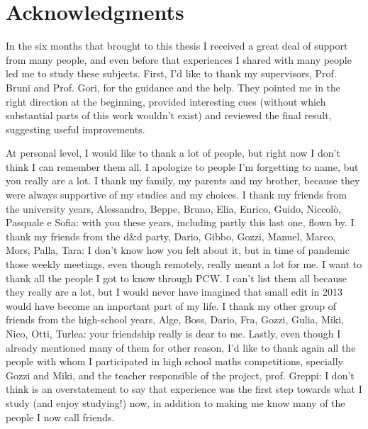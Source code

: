 \thispagestyle{plain}
\section*{Acknowledgments}
In the six months that brought to this thesis I received a great deal of support from many people, and even before that experiences I shared with many people led me to study these subjects.
First, I'd like to thank my supervisors, Prof. Bruni and Prof. Gori, for the guidance and the help. They pointed me in the right direction at the beginning, provided interesting cues (without which substantial parts of this work wouldn't exist) and reviewed the final result, suggesting useful improvements.

At personal level, I would like to thank a lot of people, but right now I don't think I can remember them all. I apologize to people I'm forgetting to name, but you really are a lot.
I thank my family, my parents and my brother, because they were always supportive of my studies and my choices.
I thank my friends from the university years, Alessandro, Beppe, Bruno, Elia, Enrico, Guido, Niccolò, Pasquale e Sofia: with you these years, including partly this last one, flown by.
I thank my friends from the d\&d party, Dario, Gibbo, Gozzi, Manuel, Marco, Mors, Palla, Tara: I don't know how you felt about it, but in time of pandemic those weekly meetings, even though remotely, really meant a lot for me.
I want to thank all the people I got to know through PCW. I can't list them all because they really are a lot, but I would never have imagined that small edit in 2013 would have become an important part of my life.
I thank my other group of friends from the high-school years, Alge, Boss, Dario, Fra, Gozzi, Gulia, Miki, Nico, Otti, Turlea: your friendship really is dear to me.
Lastly, even though I already mentioned many of them for other reason, I'd like to thank again all the people with whom I participated in high school maths competitions, specially Gozzi and Miki, and the teacher responsible of the project, prof. Greppi: I don't think is an overstatement to say that experience was the first step towards what I study (and enjoy studying!) now, in addition to making me know many of the people I now call friends.